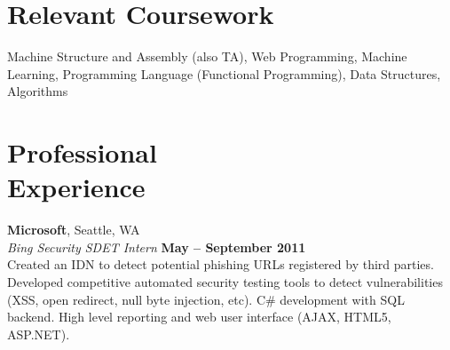 \documentclass[margin,line]{resume}
\begin{document}
\begin{resume}




    \section{\mysidestyle Relevant Coursework}
		Machine Structure and Assembly (also TA), Web Programming, Machine Learning, Programming Language (Functional Programming), Data Structures, Algorithms

    \section{\mysidestyle Professional\\Experience}
    
    
 \textbf{Microsoft}, Seattle, WA \vspace{2mm}\\\vspace{1mm}%
    \textsl{Bing Security SDET Intern} \hfill \textbf{May -- September 2011}\\
    Created an IDN to detect potential phishing URLs registered by third parties.
    Developed competitive automated security testing tools to detect vulnerabilities (XSS, open redirect, null byte injection, etc). C\# development with SQL backend. High level reporting and web user interface (AJAX, HTML5, ASP.NET).    
    

\end{resume}
\end{document}
